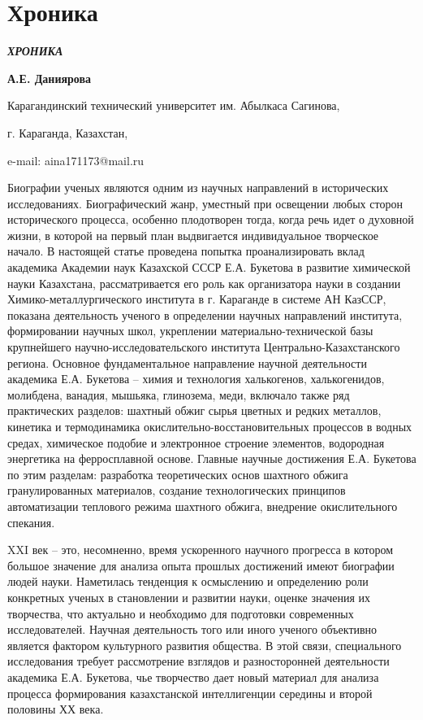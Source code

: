\newpage
{}
\let\cleardoublepage\clearpage
\part{Хроника}
\emph{{\bfseries ХРОНИКА}}


\begin{center}
{\bfseries А.Е. Даниярова}

Карагандинский технический университет им. Абылкаса Сагинова,

г. Караганда, Казахстан,

e-mail: aina171173@mail.ru
\end{center}

\begin{multicols}{2}
Биографии ученых являются одним из научных направлений в исторических
исследованиях. Биографический жанр, уместный при освещении любых сторон
исторического процесса, особенно плодотворен тогда, когда речь идет о
духовной жизни, в которой на первый план выдвигается индивидуальное
творческое начало. В настоящей статье проведена попытка проанализировать
вклад академика Академии наук Казахской СССР Е.А. Букетова в развитие
химической науки Казахстана, рассматривается его роль как организатора
науки в создании Химико-металлургического института в г. Караганде в
системе АН КазССР, показана деятельность ученого в определении научных
направлений института, формировании научных школ, укреплении
материально-технической базы крупнейшего научно-исследовательского
института Центрально-Казахстанского региона. Основное фундаментальное
направление научной деятельности академика Е.А. Букетова -- химия и
технология халькогенов, халькогенидов, молибдена, ванадия, мышьяка,
глинозема, меди, включало также ряд практических разделов: шахтный обжиг
сырья цветных и редких металлов, кинетика и термодинамика
окислительно-восстановительных процессов в водных средах, химическое
подобие и электронное строение элементов, водородная энергетика на
ферросплавной основе. Главные научные достижения Е.А. Букетова по этим
разделам: разработка теоретических основ шахтного обжига гранулированных
материалов, создание технологических принципов автоматизации теплового
режима шахтного обжига, внедрение окислительного спекания.

XXI век -- это, несомненно, время ускоренного научного прогресса в
котором большое значение для анализа опыта прошлых достижений имеют
биографии людей науки. Наметилась тенденция к осмыслению и определению
роли конкретных ученых в становлении и развитии науки, оценке значения
их творчества, что актуально и необходимо для подготовки современных
исследователей. Научная деятельность того или иного ученого объективно
является фактором культурного развития общества. В этой связи,
специального исследования требует рассмотрение взглядов и разносторонней
деятельности академика Е.А. Букетова, чье творчество дает новый материал
для анализа процесса формирования казахстанской интеллигенции середины и
второй половины ХХ века.


\end{multicols}
